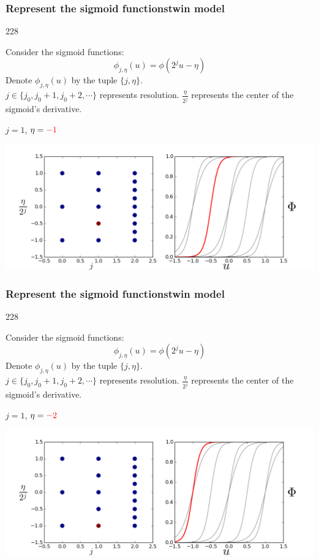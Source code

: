 \documentclass{beamer}
\newcommand{\barrow}{\item[\color{darkred}\ding{228}]}
\begin{document}
\setcounter{framenumber}{16} 
\begin{frame}
    \frametitle{Represent the sigmoid functions\hfill \scriptsize{twin model}}\small
    \begin{dinglist}{228}
        \barrow
        Consider the sigmoid functions:
        $$
            \phi_{j, \eta}(u) = \phi(2^j u - \eta)
        $$
        Denote $\phi_{j, \eta}(u)$ by the tuple $\{j, \eta\}$.\\
        \vspace{.2cm}
        $j\in \{j_0, j_0+1, j_0+2, \cdots \}$ represents resolution. $\frac{\eta}{2^j}$ represents
        the center of the sigmoid's derivative.
        \barrow $j=1$, $\eta=\textcolor{red}{-1}$\\
        \begin{center}
            \includegraphics[width=10.cm]{basis_4.png}
        \end{center}
    \end{dinglist}
\end{frame}

\setcounter{framenumber}{16} 
\begin{frame}
    \frametitle{Represent the sigmoid functions\hfill \scriptsize{twin model}}\small
    \begin{dinglist}{228}
        \barrow
        Consider the sigmoid functions:
        $$
            \phi_{j, \eta}(u) = \phi(2^j u - \eta)
        $$
        Denote $\phi_{j, \eta}(u)$ by the tuple $\{j, \eta\}$.\\
        \vspace{.2cm}
        $j\in \{j_0, j_0+1, j_0+2, \cdots \}$ represents resolution. $\frac{\eta}{2^j}$ represents
        the center of the sigmoid's derivative.
        \barrow $j=1$, $\eta=\textcolor{red}{-2}$\\
        \begin{center}
            \includegraphics[width=10.cm]{basis_5.png}
        \end{center}
    \end{dinglist}
\end{frame}
\end{document}
